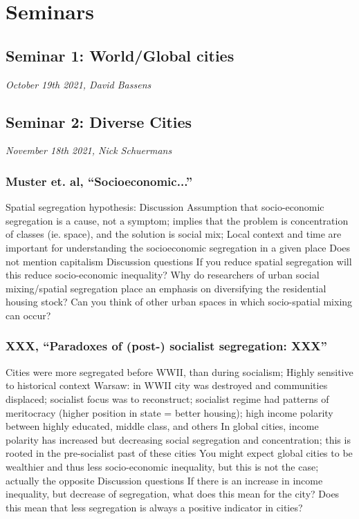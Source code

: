 \documentclass{article}
\begin{document}

\section{Seminars}

\subsection{Seminar 1: World/Global cities}
\textit{October 19th 2021, David Bassens}


\subsection{Seminar 2: Diverse Cities}
\textit{November 18th 2021, Nick Schuermans}

\subsubsection{Muster et. al, ``Socioeconomic...''}
\begin{outline}
	\1 Spatial segregation hypothesis:
		\2 
	\1 Discussion
		\2 Assumption that socio-economic segregation is a cause, not a symptom; implies that the problem is concentration of classes (ie. space), and the solution is social mix; 
		\2 Local context and time are important for understanding the socioeconomic segregation in a given place
		\2 Does not mention capitalism
	\1 Discussion questions
		\2 If you reduce spatial segregation will this reduce socio-economic inequality?
		\2 Why do researchers of urban social mixing/spatial segregation place an emphasis on diversifying the residential housing stock? Can you think of other urban spaces in which socio-spatial mixing can occur?
\end{outline}

\subsubsection{XXX, ``Paradoxes of (post-) socialist segregation: XXX''}
\begin{outline}
	\1 Cities were more segregated before WWII, than during socialism; 
	\1 Highly sensitive to historical context
		\2 Warsaw: in WWII city was destroyed and communities displaced; socialist focus was to reconstruct; socialist regime had patterns of meritocracy (higher position in state = better housing); high income polarity between highly educated, middle class, and others
	\1 In global cities, income polarity has increased but  decreasing social segregation and concentration; this is rooted in the pre-socialist past of these cities
		\2 You might expect global cities to be wealthier and thus less socio-economic inequality, but this is not the case; actually the opposite
	\1 Discussion questions
		\2 If there is an increase in income inequality, but decrease of segregation, what does this mean for the city?
		\2 Does this mean that less segregation is always a positive indicator in cities?
\end{outline}
\end{document}
